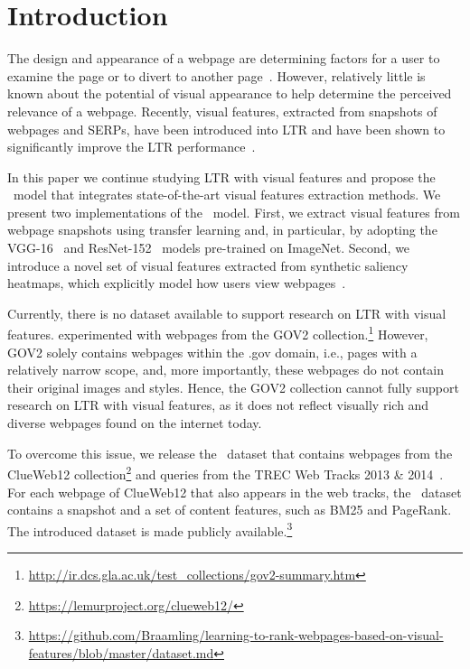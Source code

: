 
\section{Introduction}
The design and appearance of a webpage are determining factors for a user to examine the page or to divert to another page~\cite{nielsen1999designing,nielsen2006f,pernice2017f,wang2014eye}.
However, relatively little is known about the potential of visual appearance to help determine the perceived relevance of a webpage.
Recently, visual features, extracted from snapshots of webpages and \acp{SERP}, have been introduced into \acf{LTR}
and have been shown to significantly improve the \ac{LTR} performance~\cite{fan2017learning,zhang2018relevance}.

In this paper we continue studying \ac{LTR} with visual features and propose the \modelnamef~model
that integrates state-of-the-art visual features extraction methods.
We present two implementations of the \modelname~model.
First, we extract visual features from webpage snapshots using transfer learning and, in particular, by adopting the VGG-16~\cite{simonyan2014very} and ResNet-152~\cite{he2016deep} models pre-trained on ImageNet.
Second, we introduce a novel set of visual features extracted from synthetic saliency heatmaps, which explicitly model how users view webpages~\cite{shan2017two}.

Currently, there is no dataset available to support research on \ac{LTR} with visual features.
\citet{fan2017learning} experimented with webpages from the GOV2 collection.\footnote{\url{http://ir.dcs.gla.ac.uk/test_collections/gov2-summary.htm}}
However, GOV2 solely contains webpages within the .gov domain, i.e., pages with a relatively narrow scope,
and, more importantly, these webpages do not contain their original images and styles.
Hence, the GOV2 collection cannot fully support research on \ac{LTR} with visual features, as it does not reflect visually rich and diverse webpages found on the internet today.

To overcome this issue, we release the \datasetname~dataset that contains webpages from the ClueWeb12 collection\footnote{\url{https://lemurproject.org/clueweb12/}}
and queries from the TREC Web Tracks 2013 \& 2014~\cite{collins2013trec,collins2015trec}.
For each webpage of ClueWeb12 that also appears in the web tracks, the \datasetname~dataset contains a snapshot
and a set of content features, such as BM25 and PageRank.
The introduced dataset is made publicly available.\footnote{\url{https://github.com/Braamling/learning-to-rank-webpages-based-on-visual-features/blob/master/dataset.md}}

